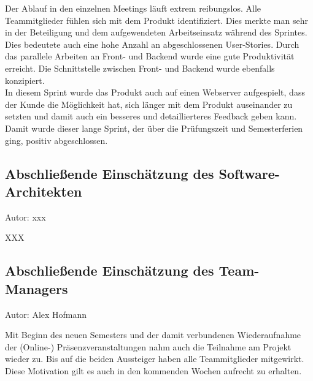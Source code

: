 Der Ablauf in den einzelnen Meetings läuft extrem reibungslos. Alle Teammitglieder fühlen sich mit dem Produkt identifiziert. Dies merkte man sehr in der Beteiligung und dem aufgewendeten Arbeitseinsatz während des Sprintes. Dies bedeutete auch eine hohe Anzahl an abgeschlossenen User-Stories. Durch das parallele Arbeiten an Front- und Backend wurde eine gute Produktivität erreicht. Die Schnittstelle zwischen Front- und Backend wurde ebenfalls konzipiert. \\
In diesem Sprint wurde das Produkt auch auf einen Webserver aufgespielt, dass der Kunde die Möglichkeit hat, sich länger mit dem Produkt auseinander zu setzten und damit auch ein besseres und detaillierteres Feedback geben kann. \\
Damit wurde dieser lange Sprint, der über die Prüfungszeit und Semesterferien ging, positiv abgeschlossen.

\subsection{Abschließende Einschätzung des Software-Architekten}
{\small Autor: xxx}

XXX

\subsection{Abschließende Einschätzung des Team-Managers}
{\small Autor: Alex Hofmann}

Mit Beginn des neuen Semesters und der damit verbundenen Wiederaufnahme der (Online-) Präsenzveranstaltungen nahm auch die Teilnahme am Projekt wieder zu. Bis auf die beiden Aussteiger haben alle Teammitglieder mitgewirkt. Diese Motivation gilt es auch in den kommenden Wochen aufrecht zu erhalten.
